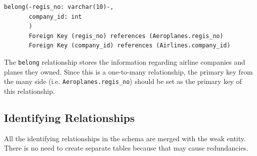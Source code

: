 \documentclass{article}
\begin{document}
	\begin{lstlisting}[keepspaces=true]	
belong(-regis_no: varchar(10)-,
       company_id: int
       )
       Foreign Key (regis_no) references (Aeroplanes.regis_no)
       Foreign Key (company_id) references (Airlines.company_id)
	\end{lstlisting}

	The \texttt{belong} relationship stores the information regarding airline companies and planes they owned. Since this is a one-to-many relationship, the primary key from the many side (i.e. \texttt{Aeroplanes.regis\_no}) should be set as the primary key of this relationship.
	
	\subsection{Identifying Relationships}
	All the identifying relationships in the schema are merged with the weak entity. There is no need to create separate tables because that may cause redundancies.
	
\end{document}
